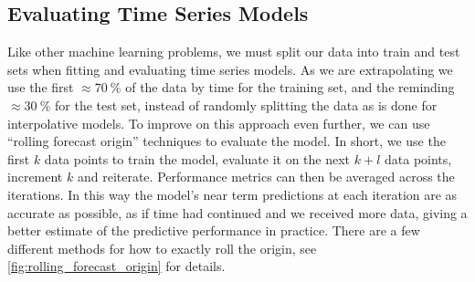 \subsection{Evaluating Time Series Models}
\label{additional:time_series:eval}

Like other machine learning problems, we must split our data into train and test sets
when fitting and evaluating time series models.
As we are extrapolating we use the first
$\approx \SI{70}{\percent}$ of the data by time for the training set,
and the reminding $\approx \SI{30}{\percent}$ for the test set,
instead of randomly splitting the data as is done for interpolative models.
To improve on this approach even further, we can use
``rolling forecast origin'' techniques to evaluate the model.
In short, we use the first $k$ data points to train the model,
evaluate it on the next $k + l$ data points, increment $k$ and reiterate.
Performance metrics can then be averaged across the iterations.
In this way the model's near term predictions at each iteration are as accurate as possible,
as if time had continued and we received more data,
giving a better estimate of the predictive performance in practice.
There are a few different methods for how to exactly roll the origin,
see \cref{fig:rolling_forecast_origin} for details.

